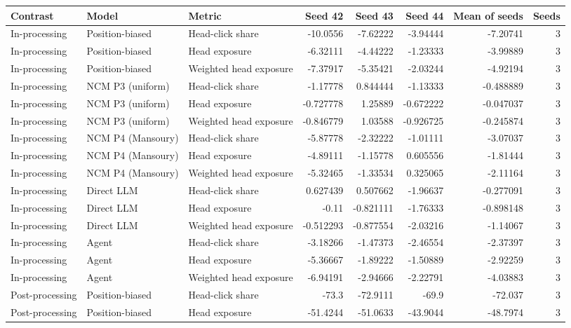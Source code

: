 \begin{table}[htbp!]
\centering
\small
\setlength{\tabcolsep}{3pt}
\renewcommand{\arraystretch}{1.1}
\begin{tabular}{lllrrrrr}
\hline
Contrast & Model & Metric & Seed 42 & Seed 43 & Seed 44 & Mean of seeds & Seeds \\
\hline
In-processing & Position-biased & Head-click share & -10.0556 & -7.62222 & -3.94444 & -7.20741 & 3 \\
In-processing & Position-biased & Head exposure & -6.32111 & -4.44222 & -1.23333 & -3.99889 & 3 \\
In-processing & Position-biased & Weighted head exposure & -7.37917 & -5.35421 & -2.03244 & -4.92194 & 3 \\
In-processing & NCM P3 (uniform) & Head-click share & -1.17778 & 0.844444 & -1.13333 & -0.488889 & 3 \\
In-processing & NCM P3 (uniform) & Head exposure & -0.727778 & 1.25889 & -0.672222 & -0.047037 & 3 \\
In-processing & NCM P3 (uniform) & Weighted head exposure & -0.846779 & 1.03588 & -0.926725 & -0.245874 & 3 \\
In-processing & NCM P4 (Mansoury) & Head-click share & -5.87778 & -2.32222 & -1.01111 & -3.07037 & 3 \\
In-processing & NCM P4 (Mansoury) & Head exposure & -4.89111 & -1.15778 & 0.605556 & -1.81444 & 3 \\
In-processing & NCM P4 (Mansoury) & Weighted head exposure & -5.32465 & -1.33534 & 0.325065 & -2.11164 & 3 \\
In-processing & Direct LLM & Head-click share & 0.627439 & 0.507662 & -1.96637 & -0.277091 & 3 \\
In-processing & Direct LLM & Head exposure & -0.11 & -0.821111 & -1.76333 & -0.898148 & 3 \\
In-processing & Direct LLM & Weighted head exposure & -0.512293 & -0.877554 & -2.03216 & -1.14067 & 3 \\
In-processing & Agent & Head-click share & -3.18266 & -1.47373 & -2.46554 & -2.37397 & 3 \\
In-processing & Agent & Head exposure & -5.36667 & -1.89222 & -1.50889 & -2.92259 & 3 \\
In-processing & Agent & Weighted head exposure & -6.94191 & -2.94666 & -2.22791 & -4.03883 & 3 \\
Post-processing & Position-biased & Head-click share & -73.3 & -72.9111 & -69.9 & -72.037 & 3 \\
Post-processing & Position-biased & Head exposure & -51.4244 & -51.0633 & -43.9044 & -48.7974 & 3 \\

\end{tabular}
\end{table}
